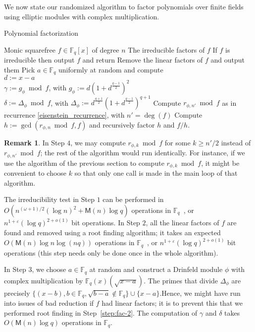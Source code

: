\documentclass[12pt]{article}
\theoremstyle{plain}
\theoremstyle{definition}
\newtheorem*{remark}{Remark}
\def\F{\ensuremath{\mathbb{F}}}
\def\MM{\ensuremath{\mathsf{M}}}
\newcommand{\D}{\Delta}
\begin{document}
We now state our randomized algorithm to factor polynomials over
finite fields using elliptic modules with complex
multiplication. 

\begin{algorithm}[H]
  \caption{Polynomial factorization}
  \label{alg:factoring}
  \begin{algorithmic}[1]
    \REQUIRE Monic squarefree $f \in \F_q[x]$ of degree $n$
    \ENSURE The irreducible factors of $f$
    \STATE If $f$ is irreducible then output $f$ and return
    \STATE\label{step:fac-2}
    Remove the linear factors of $f$ and output them
    \STATE\label{step:fac-3}
    Pick $a \in \F_q$ uniformly at random and compute \\
    $d := x - a$ \\
    $\gamma := g_\phi \bmod f$, with $g_\phi:=d(1+d^{\frac{q-1}{2}})^2$ \\
    $\delta := \Delta_\phi \bmod f$, with $\Delta_\phi:=d^{\frac{q+1}{2}}(1+d^{\frac{q-1}{2}})^{q+1}$
    \STATE\label{step:fac-4}
    Compute $r_{\phi, n'} \bmod f$ as in recurrence 
    \eqref{eisenstein_recurrence}, with $n'=\deg(f)$
    \STATE\label{step:fac-split}
    Compute $h := \gcd(r_{\phi,n} \bmod f, f)$ and recursively factor $h$ and $f/h$.
  \end{algorithmic}
\end{algorithm}

\begin{remark}
  In Step $4$, we may compute $r_{\phi,k} \bmod f$ for some $k\geq n'/2$
  instead of $r_{\phi,n'} \bmod f$; the rest of the algorithm would run
  identically. For instance, if we use the algorithm of the previous
  section to compute $r_{\phi,k} \bmod f$, it might be convenient to
  choose $k$ so that only one call is made in the main loop of that
  algorithm.
\end{remark}


The irreducibility test in Step $1$ can be performed in
$O(n^{(\omega+1)/2}(\log n)^2 + \MM(n)\log q)$ operations in
$\F_q$~\cite{vzGG}, or $n^{1+\varepsilon} (\log q)^{2+o(1)}$ bit
operations. In Step $2$, all the linear factors of $f$ are found and
removed using a root finding algorithm; it takes an expected $O(\MM(n)\log n
\log(nq))$ operations in $\F_q$~\cite{vzGG}, or $n^{1+\varepsilon}
(\log q)^{2+o(1)}$ bit operations (this step needs only be done once
in the whole algorithm).

In Step $3$, we choose $a \in \F_q$ at random and construct a Drinfeld
module $\phi$ with complex multiplication by
$\F_q(x)(\sqrt{x-a})$. The primes that divide $\D_\phi$ are
precisely $\{(x-b), b \in \F_q, \sqrt{b-a} \notin \F_q\} \cup
\{x-a\}$.Hence, we might have run into issues of bad reduction if $f$
had linear factors; it is to prevent this that we performed root finding
in Step~\ref{step:fac-2}. The computation of $\gamma$ and $\delta$ takes
$O(\MM(n)\log q)$ operations in $\F_q$.
\end{document}
